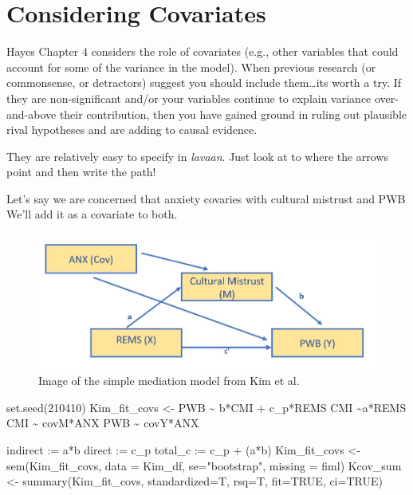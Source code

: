\documentclass[
  11pt,
]{book}
\newenvironment{Shaded}{\begin{snugshade}}{\end{snugshade}}
\newcommand{\AttributeTok}[1]{\textcolor[rgb]{0.77,0.63,0.00}{#1}}
\newcommand{\ConstantTok}[1]{\textcolor[rgb]{0.00,0.00,0.00}{#1}}
\newcommand{\DecValTok}[1]{\textcolor[rgb]{0.00,0.00,0.81}{#1}}
\newcommand{\FunctionTok}[1]{\textcolor[rgb]{0.00,0.00,0.00}{#1}}
\newcommand{\NormalTok}[1]{#1}
\newcommand{\OtherTok}[1]{\textcolor[rgb]{0.56,0.35,0.01}{#1}}
\newcommand{\StringTok}[1]{\textcolor[rgb]{0.31,0.60,0.02}{#1}}
\begin{document}
\hypertarget{considering-covariates}{%
\section{Considering Covariates}\label{considering-covariates}}

Hayes Chapter 4 \citeyearpar{hayes_introduction_2018} considers the role of covariates (e.g., other variables that could account for some of the variance in the model). When previous research (or commonsense, or detractors) suggest you should include them\ldots its worth a try. If they are non-significant and/or your variables continue to explain variance over-and-above their contribution, then you have gained ground in ruling out plausible rival hypotheses and are adding to causal evidence.

They are relatively easy to specify in \emph{lavaan}. Just look at to where the arrows point and then write the path!

Let's say we are concerned that anxiety covaries with cultural mistrust and PWB We'll add it as a covariate to both.

\begin{figure}
\centering
\includegraphics{images/SimpleMed/Kim_wCovs.jpg}
\caption{Image of the simple mediation model from Kim et al.}
\end{figure}

\begin{Shaded}
\begin{Highlighting}[]
\FunctionTok{set.seed}\NormalTok{(}\DecValTok{210410}\NormalTok{)}
\NormalTok{Kim\_fit\_covs }\OtherTok{\textless{}{-}} \StringTok{\textquotesingle{}}
\StringTok{          PWB \textasciitilde{} b*CMI + c\_p*REMS }
\StringTok{          CMI \textasciitilde{}a*REMS}
\StringTok{          CMI \textasciitilde{} covM*ANX}
\StringTok{          PWB \textasciitilde{} covY*ANX}

\StringTok{          indirect :=  a*b}
\StringTok{          direct  := c\_p}
\StringTok{          total\_c  := c\_p + (a*b)}
\StringTok{          \textquotesingle{}}
\NormalTok{Kim\_fit\_covs }\OtherTok{\textless{}{-}} \FunctionTok{sem}\NormalTok{(Kim\_fit\_covs, }\AttributeTok{data =}\NormalTok{ Kim\_df, }\AttributeTok{se=}\StringTok{"bootstrap"}\NormalTok{, }\AttributeTok{missing =} \StringTok{\textquotesingle{}fiml\textquotesingle{}}\NormalTok{)}
\NormalTok{Kcov\_sum }\OtherTok{\textless{}{-}} \FunctionTok{summary}\NormalTok{(Kim\_fit\_covs, }\AttributeTok{standardized=}\NormalTok{T, }\AttributeTok{rsq=}\NormalTok{T, }\AttributeTok{fit=}\ConstantTok{TRUE}\NormalTok{, }\AttributeTok{ci=}\ConstantTok{TRUE}\NormalTok{)}
\end{Highlighting}
\end{Shaded}
\end{document}
